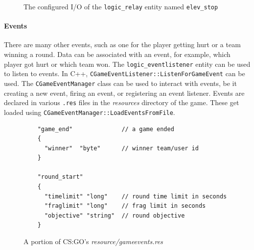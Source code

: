 \documentclass[a4paper, 12pt]{scrartcl}
\begin{document}
\begin{figure}[!ht]
  \centering
  \qquad
  \caption{The configured I/O of the \texttt{logic\_relay} entity named \texttt{elev\_stop}}
  \label{fig:source_elev_stop}
\end{figure}

\paragraph{Events}
There are many other events, such as one for the player getting hurt or a team winning a round. Data can be associated with an event, for example, which player got hurt or which team won. The \texttt{logic\_eventlistener} entity can be used to listen to events. In C++, \texttt{CGameEventListener::ListenForGameEvent} can be used. The \texttt{CGameEventManager} class can be used to interact with events, be it creating a new event, firing an event, or registering an event listener. Events are declared in various \texttt{.res} files in the \textit{resources} directory of the game. These get loaded using \texttt{CGameEventManager::LoadEventsFromFile}.

\begin{figure}[!ht]
  \begin{verbatim}
    "game_end"              // a game ended
    {
      "winner"  "byte"      // winner team/user id
    }

    "round_start"
    {
      "timelimit" "long"    // round time limit in seconds
      "fraglimit" "long"    // frag limit in seconds
      "objective" "string"  // round objective
    }
  \end{verbatim}
  \caption{A portion of CS:GO's \textit{resource/gameevents.res}}
  \label{fig:source_gameevents}
\end{figure}
\end{document}
